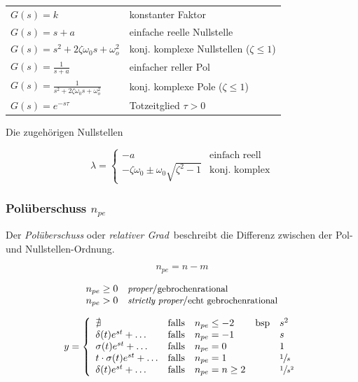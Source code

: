 \documentclass[
  10pt,
  a4paper,
]{article}
\makeatletter
\numberwithin{equation}{section}
\newenvironment{conditions}
  {\par\vspace{\abovedisplayskip}\noindent\begin{tabular}{>{$}l<{$} @{${}:{}$} l}}
  {\end{tabular}\par\vspace{\belowdisplayskip}}
\makeatother
\begin{document}
\begin{multicols}{2}
\begin{conditions}
  G(s)=k                                         & konstanter Faktor \\
  G(s)=s + a                                     & einfache reelle Nullstelle \\
  G(s)=s^2+2\zeta\omega_0 s+\omega_o^2           & konj. komplexe Nullstellen ($\zeta \leq 1$) \\
  G(s)=\frac{1}{s+a}                             & einfacher reller Pol \\
  G(s)=\frac{1}{s^2+2\zeta\omega_0 s+\omega_o^2} & konj. komplexe Pole ($\zeta\leq 1$) \\
  G(s)=e^{-s\tau}                                & Totzeitglied $\tau > 0$ \\
\end{conditions}

Die zugehörigen Nullstellen

\[
\lambda = \left\{ \begin{array}{cl}
-a & \text{einfach reell} \\
-\zeta\omega_0 \pm \omega_0 \sqrt{\zeta^2-1} & \text{konj. komplex}
\end{array}\right.
\]

\hypertarget{poluxfcberschuss-n_pe}{%
\subsubsection{\texorpdfstring{Polüberschuss
\(n_{pe}\)}{Polüberschuss n\_\{pe\}}}\label{poluxfcberschuss-n_pe}}

Der \emph{Polüberschuss} oder \emph{relativer Grad}~beschreibt die
Differenz zwischen der Pol- und Nullstellen-Ordnung.

\[
n_{pe} = n - m
\]

\[
\begin{array}{ll}
n_{pe} \geq 0 & \small{\textit{proper}/\text{gebrochenrational}} \\
n_{pe}  >   0 & \small{\textit{strictly proper}/\text{echt gebrochenrational}} \\
\end{array}
\]

\[
y=\left\{
\begin{array}{lclcl}
\nexists & \text{falls} & n_{pe} \leq -2 & \text{bsp} & s^2 \\
\delta(t)e^{st}+\ldots & \text{falls} & n_{pe} = -1 &  & s \\
\sigma(t)e^{st}+\ldots & \text{falls} & n_{pe} = 0 &  & 1 \\
t\cdot\sigma(t)e^{st}+\ldots & \text{falls} & n_{pe} = 1 &  & \sfrac{1}{s} \\
\delta(t)e^{st}+\ldots & \text{falls} & n_{pe} = n \geq 2 &  &  \sfrac{1}{s^2}
\end{array}
\right.
\]


\end{multicols}
\end{document}
